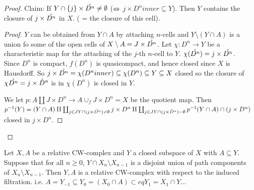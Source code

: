 \documentclass{TemplateLecture}
\begin{document}
\begin{proof}
    Claim: If \(Y \cap \{j\} \times \mathring{D^n} \neq \emptyset\) (\(\Leftrightarrow\) \(j\times D^n inner \subseteq Y\)).
    Then \(Y\) contains the closure of \(j\times \mathring{D^n}\) in \(X\). ( = the closure of this cell).

    \begin{proof}
        \(Y\) can be obtained from \(Y \cap A\) by attaching \(n\)-cells and \(Y\setminus (Y\cap A)\) is a union fo some of the open cells of \(X\setminus A = J\times \mathring{D^n}\). Let \(\chi \colon D^n \to Y\) be a characteristic map for the attaching of the \(j\)-th \(n\)-cell to \(Y\).
        \(\chi(\mathring{D^n}) = j \times \mathring{D^n}\). Since \(D^n\) is compact, \(f(D^n)\) is quasicompact, and hence closed since \(X\) is Hausdorff. So \(j\times \mathring{D^n} = \chi(D^n inner) \subseteq \chi(D^n) \subseteq Y \subseteq X\) closed so the closure of \(\chi\mathring{D^n} = j \times \mathring{D}^n\) is in \(\chi(D^n)\) is closed in \(Y\).

        We let \(p\colon A \amalg J\times D^n \to A \cup_f J\times D^n = X\) be the quotient map. Then 
        \(p^{-1}(Y) = (Y\cap A) \amalg \coprod_{j \in J Y \cap (j\times \mathring{D^n}) \neq \emptyset} j\times D^n \amalg \coprod_{j \in J Y\cap (j\times \mathring{D}^n) = \emptyset} p^{-1}(Y\cap A) \cap (j\times D^n)\) closed in \(j\times D^n\).
    \end{proof}
\end{proof}

Let \(X,A\) be a relative CW-complex and \(Y\) a closed subspace of \(X\) with \(A \subseteq Y\). Suppose that for all \(n \geq 0\), \(Y \cap X_n \setminus X_{n-1}\) is a disjoint union of path components of \(X_n \setminus X_{n-1}\). Then \(Y, A\) is a relative CW-complex with respect to the induced filtration.
i.e.
\(A = Y_{-1} \subseteq Y_0 = (X_0 \cap A) \subset eq Y_1 = X_1 \cap Y \dots\) %
\end{document}
